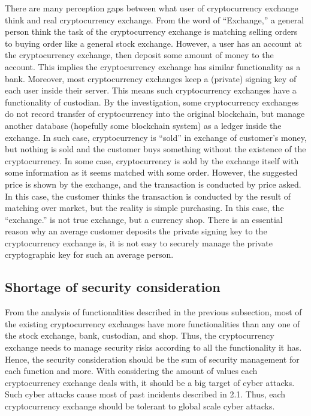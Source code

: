 There are many perception gaps between what user of cryptocurrency exchange think and real cryptocurrency exchange.
From the word of ``Exchange,'' a general person think the task of the cryptocurrency exchange is matching selling orders to buying order
like a general stock exchange.
However, a user has an account at the cryptocurrency exchange, then deposit some amount of money to the account. This implies the cryptocurrency exchange has similar functionality as a bank. Moreover, most cryptocurrency exchanges keep a (private) signing key of each user inside their server. This means such cryptocurrency exchanges have a functionality of custodian.
By the investigation,
some cryptocurrency exchanges do not record transfer of cryptocurrency into
the original blockchain, but manage another database (hopefully some blockchain system) as a ledger inside the exchange.
In such case, cryptocurrency is ``sold'' in exchange of customer's money, but nothing is sold and the customer buys something
without the existence of the cryptocurrency.
In some case, cryptocurrency is sold by the exchange itself with some information as it seems matched with some order. However,
the suggested price is shown by the exchange, and the transaction is conducted by price asked. In this case, the customer thinks
the transaction is conducted by the result of matching over market,  but the reality is simple purchasing. In this case, the ``exchange.''
is not true exchange, but a currency shop.
There is an essential reason why an average customer deposits the private signing key to the cryptocurrency exchange is,
it is not easy to securely manage the private cryptographic key for such an average person.


\subsection{Shortage of security consideration}
From the analysis of functionalities described in the previous subsection, most of the existing cryptocurrency exchanges
have more functionalities than any one of the stock exchange, bank, custodian, and shop.
Thus, the cryptocurrency exchange needs to manage security risks according to all the functionality it has.
Hence, the security consideration should be the sum of security management for each function and more.
With considering the amount of values each cryptocurrency exchange deals with, it should be a big target of cyber attacks.
Such cyber attacks cause most of past incidents described in 2.1. Thus, each cryptocurrency exchange should be
tolerant to global scale cyber attacks.

